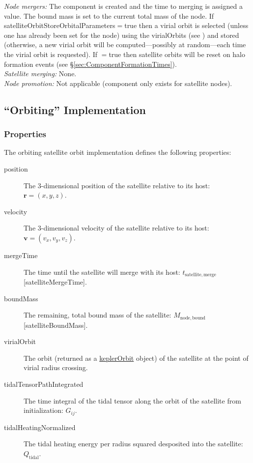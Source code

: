 \noindent\emph{Node mergers:} The \gls{component} is created and the time to merging is assigned a value. The bound mass is set to the current total mass of the node. If {\normalfont \ttfamily satelliteOrbitStoreOrbitalParameters}$=${\normalfont \ttfamily true} then a virial orbit is selected (unless one has already been set for the node) using the {\normalfont \ttfamily virialOrbits} (see ) and stored (otherwise, a new virial orbit will be computed---possibly at random---each time the virial orbit is requested). If {\normalfont \ttfamily [satelliteOrbitResetOnHaloFormation]}$=${\normalfont \ttfamily true} then satellite orbits will be reset on halo formation events (see \S\ref{sec:ComponentFormationTimes}).\\

\noindent\emph{Satellite merging:} None.\\

\noindent\emph{Node promotion:} Not applicable (component only exists for satellite nodes).\\

\subsection{``Orbiting'' Implementation}\label{sec:ComponentSatelliteOrbiting}

\subsubsection{Properties}

The orbiting satellite orbit implementation defines the following properties:
\begin{description}
 \item [{\normalfont \ttfamily position}] The 3-dimensional position of the satellite relative to its host: $\mathbf{r}=(x,y,z)$.
 \item [{\normalfont \ttfamily velocity}] The 3-dimensional velocity of the satellite relative to its host: $\mathbf{v}=(v_x,v_y,v_z)$.
 \item [{\normalfont \ttfamily mergeTime}] The time until the satellite will merge with its host: $t_\mathrm{satellite, merge}$ [{\normalfont \ttfamily satelliteMergeTime}].
 \item [{\normalfont \ttfamily boundMass}] The remaining, total bound mass of the satellite: $M_\mathrm{node,bound}$ [{\normalfont \ttfamily satelliteBoundMass}].
 \item[{\normalfont \ttfamily virialOrbit}] The orbit (returned as a \href{https://github.com/galacticusorg/galacticus/releases/download/bleeding-edge/Galacticus_Development.pdf\#sec.KeplerOrbits}{\normalfont \ttfamily keplerOrbit} object) of the satellite at the point of virial radius crossing.
 \item[{\normalfont \ttfamily tidalTensorPathIntegrated}] The time integral of the tidal tensor along the orbit of the satellite from initialization: $G_{ij}$.
 \item[{\normalfont \ttfamily tidalHeatingNormalized}] The tidal heating energy per radius squared desposited into the satellite: $Q_\mathrm{tidal}$.
\end{description}

